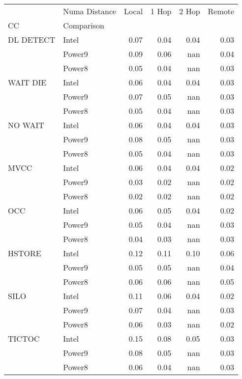 \begin{tabular}{llrrrr}
\toprule
       & Numa Distance &  Local &  1 Hop &  2 Hop &  Remote \\
CC & Comparison &        &        &        &         \\
\midrule
DL DETECT & Intel &   0.07 &   0.04 &   0.04 &    0.03 \\
       & Power9 &   0.09 &   0.06 &    nan &    0.04 \\
       & Power8 &   0.05 &   0.04 &    nan &    0.03 \\
WAIT DIE & Intel &   0.06 &   0.04 &   0.04 &    0.03 \\
       & Power9 &   0.07 &   0.05 &    nan &    0.03 \\
       & Power8 &   0.05 &   0.04 &    nan &    0.03 \\
NO WAIT & Intel &   0.06 &   0.04 &   0.04 &    0.03 \\
       & Power9 &   0.08 &   0.05 &    nan &    0.03 \\
       & Power8 &   0.05 &   0.04 &    nan &    0.03 \\
MVCC & Intel &   0.06 &   0.04 &   0.04 &    0.02 \\
       & Power9 &   0.03 &   0.02 &    nan &    0.02 \\
       & Power8 &   0.02 &   0.02 &    nan &    0.02 \\
OCC & Intel &   0.06 &   0.05 &   0.04 &    0.02 \\
       & Power9 &   0.05 &   0.04 &    nan &    0.03 \\
       & Power8 &   0.04 &   0.03 &    nan &    0.03 \\
HSTORE & Intel &   0.12 &   0.11 &   0.10 &    0.06 \\
       & Power9 &   0.05 &   0.05 &    nan &    0.04 \\
       & Power8 &   0.06 &   0.06 &    nan &    0.05 \\
SILO & Intel &   0.11 &   0.06 &   0.04 &    0.02 \\
       & Power9 &   0.07 &   0.04 &    nan &    0.03 \\
       & Power8 &   0.06 &   0.03 &    nan &    0.02 \\
TICTOC & Intel &   0.15 &   0.08 &   0.05 &    0.03 \\
       & Power9 &   0.08 &   0.05 &    nan &    0.03 \\
       & Power8 &   0.06 &   0.04 &    nan &    0.03 \\
\bottomrule
\end{tabular}
